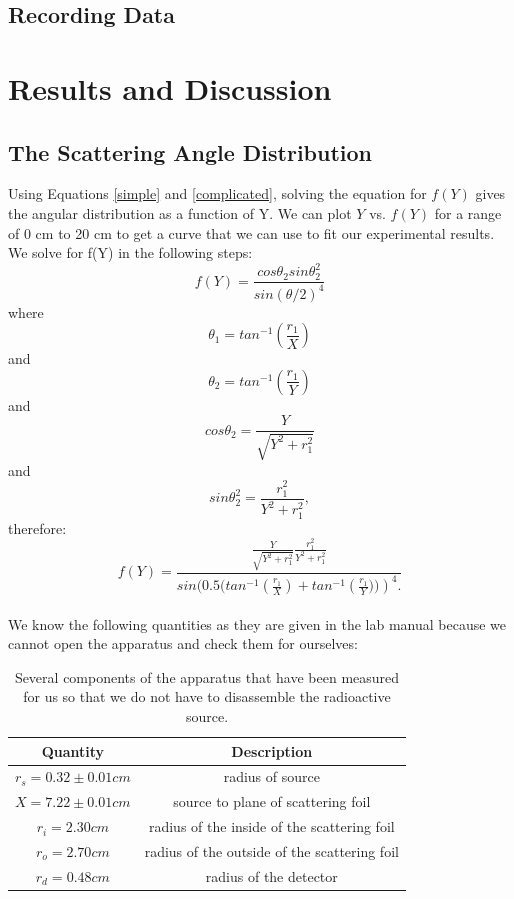 \subsection{Recording Data}

\section{Results and Discussion}
\subsection{The Scattering Angle Distribution}
Using Equations \ref{simple} and \ref{complicated}, solving the equation for $f(Y)$ gives the angular distribution as a function of Y. We can plot $Y$ vs. $f(Y)$ for a range of 0 cm to 20 cm to get a curve that we can use to fit our experimental results. We solve for f(Y) in the following steps:
\begin{equation} f(Y)=\frac{cos\theta_2 sin\theta_2^2}{sin(\theta/2)^4} \end{equation} where
\begin{equation} \theta_1=tan^{-1}\left(\frac{r_1}{X}\right)\end{equation} and
\begin{equation} \theta_2=tan^{-1}\left(\frac{r_1}{Y}\right)\end{equation} and
\begin{equation} cos\theta_2=\frac{Y}{\sqrt{Y^2+r_1^2}} \end{equation} and
\begin{equation} sin\theta_2^2=\frac{r_1^2}{Y^2+r_1^2}, \end{equation} therefore:
\begin{equation} f(Y)= \frac{\frac{Y}{\sqrt{Y^2+r_1^2}} \frac{r_1^2}{Y^2+r_1^2}}{sin(0.5(tan^{-1}\left(\frac{r_1}{X}\right) + tan^{-1}\left(\frac{r_1}{Y}))\right)^4.} \end{equation}\\
We know the following quantities as they are given in the lab manual because we cannot open the apparatus and check them for ourselves:
\begin{table}[H]
\begin{center}
\begin{tabular}{|c|c|}\hline
Quantity & Description \\ \hline 
$r_s=0.32\pm0.01cm$ & radius of source\\ \hline 
$X=7.22\pm0.01cm$ & source to plane of scattering foil\\ \hline
$r_i=2.30cm$ & radius of the inside of the scattering foil\\ \hline
$r_o=2.70cm$ & radius of the outside of the scattering foil\\ \hline
$r_d=0.48cm$ & radius of the detector\\ \hline
\end{tabular}
\caption{Several components of the apparatus that have been measured for us so that we do not have to disassemble the radioactive source.}
\end{center}
\end{table}
